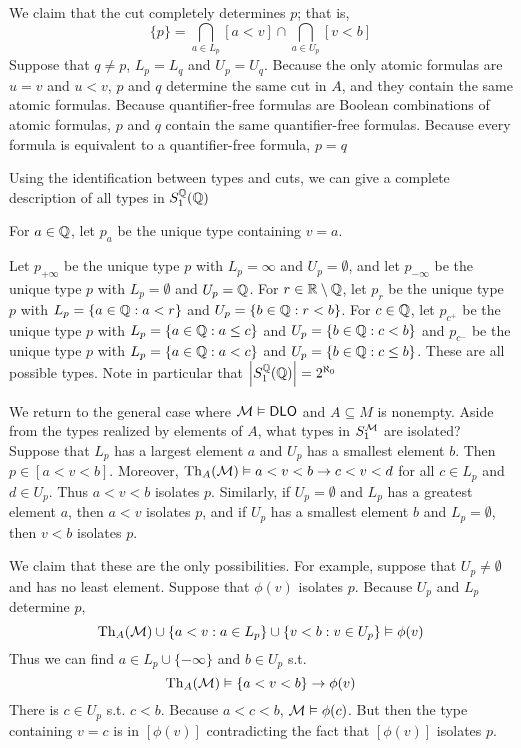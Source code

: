 \documentclass[11pt]{article}
\begin{document}
We claim that the cut completely determines \(p\); that is,
\begin{equation*}
\{p\}=\bigcap_{a\in L_p}[a<v]\cap\bigcap_{a\in U_p}[v<b]
\end{equation*}
Suppose that \(q\neq p\), \(L_p=L_q\) and \(U_p=U_q\). Because the only atomic formulas are \(u=v\)
and \(u<v\), \(p\) and \(q\) determine the same cut in \(A\), and they contain the same atomic
formulas. Because quantifier-free formulas are Boolean combinations of atomic formulas, \(p\)
and \(q\) contain the same quantifier-free formulas. Because every formula is equivalent to a
quantifier-free formula, \(p=q\)

Using the identification between types and cuts, we can give a complete description of all types
in \(S_1^{\mathbb{Q}}(\mathbb{Q})\)

For \(a\in\mathbb{Q}\), let \(p_a\) be the unique type containing \(v=a\).

Let \(p_{+\infty}\) be the unique type \(p\) with \(L_p=\infty\) and \(U_p=\emptyset\), and let \(p_{-\infty}\) be the
unique type \(p\) with \(L_p=\emptyset\) and \(U_p=\mathbb{Q}\). For \(r\in\mathbb{R}\setminus\mathbb{Q}\), let \(p_r\) be the unique
type \(p\) with \(L_p=\{a\in\mathbb{Q}:a<r\}\) and \(U_p=\{b\in\mathbb{Q}:r<b\}\). For \(c\in\mathbb{Q}\), let \(p_{c^+}\) be the
unique type \(p\) with \(L_p=\{a\in\mathbb{Q}:a\le c\}\) and \(U_p=\{b\in\mathbb{Q}:c<b\}\) and \(p_{c^-}\) be the unique
type \(p\) with \(L_p=\{a\in\mathbb{Q}:a<c\}\) and \(U_p=\{b\in\mathbb{Q}:c\le b\}\). These are all possible types. Note in
particular that \(\abs{S_1^{\Q}(\Q)}=2^{\aleph_0}\)

We return to the general case where \(\mathcal{M}\vDash\operatorname{\textsf{DLO}}\) and \(A\subseteq M\) is nonempty. Aside from the types
realized by elements of \(A\), what types in \(S_1^{\mathcal{M}}\) are isolated? Suppose that \(L_p\) has a
largest element \(a\) and \(U_p\) has a smallest element \(b\). Then \(p\in[a<v<b]\).
Moreover, \(\operatorname{Th}_A(\mathcal{M})\vDash a<v<b\to c<v<d\) for all \(c\in L_p\) and \(d\in U_p\). Thus \(a<v<b\)
isolates \(p\). Similarly, if \(U_p=\emptyset\) and \(L_p\) has a greatest element \(a\), then \(a<v\)
isolates \(p\), and if \(U_p\) has a smallest element \(b\) and \(L_p=\emptyset\), then \(v<b\)
isolates \(p\).

We claim that these are the only possibilities. For example, suppose that \(U_p\neq\emptyset\) and has no
least element. Suppose that \(\phi(v)\) isolates \(p\). Because \(U_p\) and \(L_p\)
determine \(p\),
\begin{equation*}
\operatorname{Th}_A(\mathcal{M})\cup\{a<v:a\in L_p\}\cup\{v<b:v\in U_p\}\vDash\phi(v)
\end{equation*}
Thus we can find \(a\in L_p\cup\{-\infty\}\) and \(b\in U_p\) s.t.
\begin{equation*}
\operatorname{Th}_A(\mathcal{M})\vDash\{a<v<b\}\to\phi(v)
\end{equation*}
There is \(c\in U_p\) s.t. \(c<b\). Because \(a<c<b\), \(\mathcal{M}\vDash\phi(c)\). But then the type
containing \(v=c\) is in \([\phi(v)]\) contradicting the fact that \([\phi(v)]\) isolates \(p\).
\end{document}
